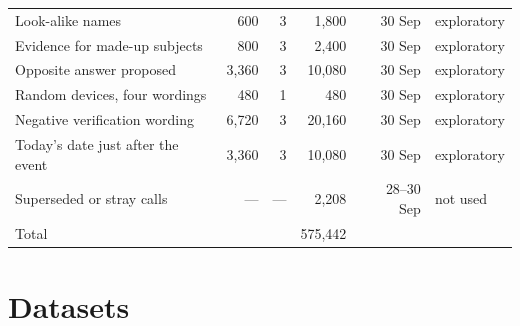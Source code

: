 \documentclass[10pt,twocolumn]{article}
\begin{document}
{\begin{longtable}{@{}p{} r r r r p{}@{}}
Look-alike names & 600 & 3 & 1{,}800 & 30 Sep & exploratory \\
Evidence for made-up subjects & 800 & 3 & 2{,}400 & 30 Sep & exploratory \\
Opposite answer proposed & 3{,}360 & 3 & 10{,}080 & 30 Sep & exploratory \\
Random devices, four wordings & 480 & 1 & 480 & 30 Sep & exploratory \\
Negative verification wording & 6{,}720 & 3 & 20{,}160 & 30 Sep & exploratory \\
Today's date just after the event & 3{,}360 & 3 & 10{,}080 & 30 Sep & exploratory \\
Superseded or stray calls & --- & --- & 2{,}208 & 28--30 Sep & not used \\
\midrule
Total & & & 575{,}442 & & \\
\bottomrule
\end{longtable}
}

\section{Datasets}
\label{app:datasets}
\end{document}
